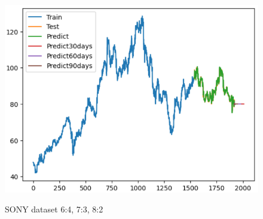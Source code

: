 \documentclass[conference]{IEEEtran}
\begin{document}
\begin{figure}[H]
\begin{minipage}{0.15\textwidth}
    \label{fig:2}
    \end{minipage}%
    \begin{minipage}{0.15\textwidth}
    \centering
    \includegraphics[width=1\textwidth]{Image/XGBoost/XGBoost_SONY_8_2.png}

    \label{fig:3}
    \end{minipage}
    \caption{ SONY dataset 6:4, 7:3, 8:2}
\end{figure}
\end{document}
